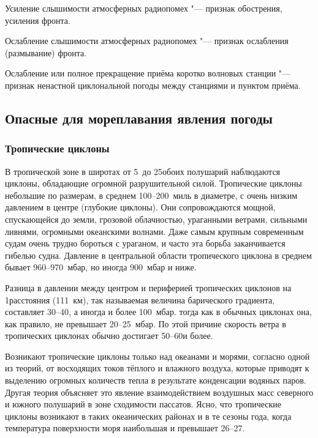  Усиление слышимости атмосферных радиопомех "--- признак
обострения, усиления фронта.

 Ослабление слышимости атмосферных радиопомех "--- признак
ослабления (размывание) фронта.

 Ослабление или полное прекращение приёма коротко волновых
станции "--- признак ненастной циклональной погоды между станциями и
пунктом приёма.

\subsection{Опасные для мореплавания явления погоды}

\subsubsection{Тропические циклоны}

В тропической зоне в широтах от 5~до 25\gr обоих полушарий наблюдаются
циклоны, обладающие огромной разрушительной силой. Тропические циклоны
небольшие по размерам, в среднем 100--200~миль в диаметре, с очень
низким давлением в центре (глубокие циклоны). Они сопровождаются
мощной, спускающейся до земли, грозовой облачностью, ураганными
ветрами, сильными ливнями, огромными океанскими волнами. Даже самым
крупным современным судам очень трудно бороться с ураганом, и часто
эта борьба заканчивается гибелью судна. Давление в центральной области
тропического циклона в среднем бывает 960--970~мбар, но иногда 900~мбар
и ниже.

Разница в давлении между центром и периферией тропических циклонов на
1\gr расстояния (111~км), так называемая величина барического градиента,
составляет 30--40, а иногда и более 100~мбар. тогда как в обычных
циклонах она, как правило, не превышает 20--25~мбар. По этой причине
скорость ветра в тропических циклонах обычно достигает 50--60\speedms и
более.

Возникают тропические циклоны только над океанами и морями, согласно
одной из теорий, от восходящих токов тёплого и влажного воздуха,
которые приводят к выделению огромных количеств тепла в результате
конденсации водяных паров. Другая теория объясняет это явление
взаимодействием воздушных масс северного и южного полушарий в зоне
сходимости пассатов. Ясно, что тропические циклоны возникают в таких
океанических районах и в те сезоны года, когда температура поверхности
моря наибольшая и превышает 26--27\grC.

